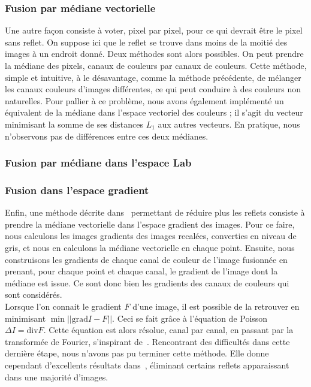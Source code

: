 \documentclass[12pt,a4paper]{article}
\begin{document}
\subsubsection{Fusion par médiane vectorielle}
\label{fusiontruemediane}
Une autre façon consiste à voter, pixel par pixel, pour ce qui devrait être le pixel sans reflet. On suppose ici que le reflet se trouve dans moins de la moitié des images à un endroit donné. Deux méthodes sont alors possibles. On peut prendre la médiane des pixels, canaux de couleurs par canaux de couleurs. Cette méthode, simple et intuitive, à le désavantage, comme la méthode précédente, de mélanger les canaux couleurs d'images différentes, ce qui peut conduire à des couleurs non naturelles. Pour pallier à ce problème, nous avons également implémenté un équivalent de la médiane dans l'espace vectoriel des couleurs ; il s'agit du vecteur minimisant la somme de ses distances $L_1$ aux autres vecteurs. En pratique, nous n'observons pas de différences entre ces deux médianes. 
\subsubsection{Fusion par médiane dans l'espace Lab}
\label{fusionlab}
\subsubsection{Fusion dans l'espace gradient}
\label{fusiongrad}
Enfin, une méthode décrite dans~\citep{haro2012photographing} permettant de réduire plus les reflets consiste à prendre la médiane vectorielle dans l'espace gradient des images. Pour ce faire, nous calculons les images gradients des images recalées, converties en niveau de gris, et nous en calculons la médiane vectorielle en chaque point. Ensuite, nous construisons les gradients de chaque canal de couleur de l'image fusionnée en prenant, pour chaque point et chaque canal, le gradient de l'image dont la médiane est issue. Ce sont donc bien les gradients des canaux de couleurs qui sont considérés.\\
Lorsque l'on connait le gradient $F$ d'une image, il est possible de la retrouver en minimisant $\min||\mathrm{grad}I - F||$. Ceci se fait grâce à l'équation de Poisson $\Delta I = \mathrm{div}F$. Cette équation est alors résolue, canal par canal, en passant par la transformée de Fourier, s'inspirant de~\citep{morel2010pde}. Rencontrant des difficultés dans cette dernière étape, nous n'avons pas pu terminer cette méthode. Elle donne cependant d'excellents résultats dans~\citep{haro2012photographing}, éliminant certains reflets apparaissant dans une majorité d'images.
\end{document}
